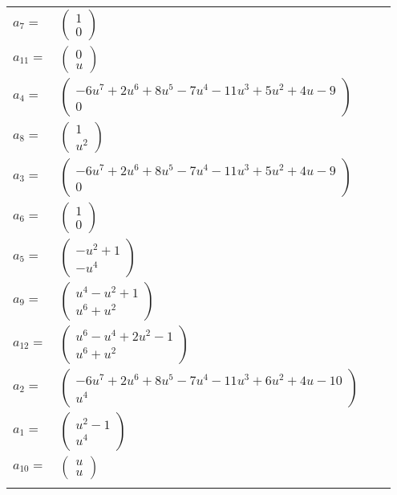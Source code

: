 \documentclass[1p]{elsarticle_modified}
\theoremstyle{definition}
\begin{document}
\begin{tabular}{m{7pt} m{180pt} m{7pt} m{180pt} }
\flushright $a_{7}=$&$\begin{pmatrix}1\\0\end{pmatrix}$ \\
\flushright $a_{11}=$&$\begin{pmatrix}0\\u\end{pmatrix}$ \\
\flushright $a_{4}=$&$\begin{pmatrix}-6 u^7+2 u^6+8 u^5-7 u^4-11 u^3+5 u^2+4 u-9\\0\end{pmatrix}$ \\
\flushright $a_{8}=$&$\begin{pmatrix}1\\u^2\end{pmatrix}$ \\
\flushright $a_{3}=$&$\begin{pmatrix}-6 u^7+2 u^6+8 u^5-7 u^4-11 u^3+5 u^2+4 u-9\\0\end{pmatrix}$ \\
\flushright $a_{6}=$&$\begin{pmatrix}1\\0\end{pmatrix}$ \\
\flushright $a_{5}=$&$\begin{pmatrix}- u^2+1\\- u^4\end{pmatrix}$ \\
\flushright $a_{9}=$&$\begin{pmatrix}u^4- u^2+1\\u^6+u^2\end{pmatrix}$ \\
\flushright $a_{12}=$&$\begin{pmatrix}u^6- u^4+2 u^2-1\\u^6+u^2\end{pmatrix}$ \\
\flushright $a_{2}=$&$\begin{pmatrix}-6 u^7+2 u^6+8 u^5-7 u^4-11 u^3+6 u^2+4 u-10\\u^4\end{pmatrix}$ \\
\flushright $a_{1}=$&$\begin{pmatrix}u^2-1\\u^4\end{pmatrix}$ \\
\flushright $a_{10}=$&$\begin{pmatrix}u\\u\end{pmatrix}$\\&\end{tabular}
\end{document}
